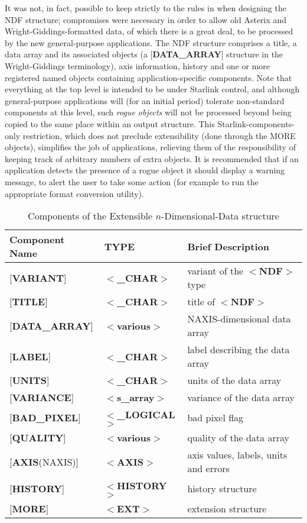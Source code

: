 It was not, in fact, possible to keep strictly to
the rules in 
 when
designing
the NDF structure;
compromises were necessary in order to
allow old Asterix and Wright-Giddings-formatted data,
of which there is a great deal,
to be processed by the new general-purpose applications.
The NDF structure comprises a title, a data array and its associated objects
(a {[}{\bf DATA\_ARRAY}{]} structure in the Wright-Giddings terminology),
axis information, history and one or more registered named objects containing
application-specific components.  
Note that everything at the top level is intended to be under Starlink
control, and although general-purpose applications will (for
an initial period) tolerate
non-standard components at this level, such
{\it rogue objects} will not be processed beyond being
copied to the same place within an output structure.  This
Starlink-components-only restriction, which does
not preclude extensibility (done through the MORE objects),
simplifies the job of applications,
relieving them of the responsibility
of keeping track of arbitrary
numbers of extra objects.
It is recommended that if an
application detects the presence of a
rogue object it should
display a warning message, to alert the user to
take some action (for example to run the
appropriate format conversion utility).

\begin{table}[htb]
\centering
\caption{Components of the Extensible $n$-Dimensional-Data structure}
\begin{tabular}{|l|l|l|}
\hline
Component Name & TYPE & Brief Description \\ \hline
{[}{\bf VARIANT}{]} & $<${\bf \_CHAR}$>$ & variant of the $<${\bf NDF}$>$ type \\
{[}{\bf TITLE}{]} & $<${\bf \_CHAR}$>$ & title of $<${\bf NDF}$>$ \\
{[}{\bf DATA\_ARRAY}{]} & $<${\bf various}$>$ & NAXIS-dimensional data array \\
{[}{\bf LABEL}{]} & $<${\bf \_CHAR}$>$ & label describing the data array \\
{[}{\bf UNITS}{]} & $<${\bf \_CHAR}$>$ & units of the data array \\
{[}{\bf VARIANCE}{]} & $<${\bf s\_array}$>$ & variance of the data array \\
{[}{\bf BAD\_PIXEL}{]} & $<${\bf \_LOGICAL}$>$ & bad pixel flag \\
{[}{\bf QUALITY}{]} & $<${\bf various}$>$ & quality of the data array \\
{[}{\bf AXIS}(NAXIS){]} & $<${\bf AXIS}$>$ & axis values, labels, units and errors \\
{[}{\bf HISTORY}{]} & $<${\bf HISTORY}$>$ & history structure \\ 
{[}{\bf MORE}{]} & $<${\bf EXT}$>$  & extension structure \\ \hline
\end{tabular}
\end{table}

